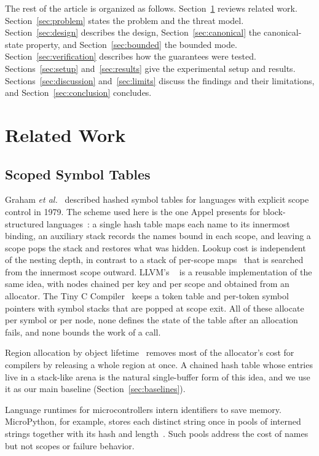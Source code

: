 The rest of the article is organized as follows. Section~\ref{sec:related} reviews related work. Section~\ref{sec:problem} states the problem and the threat model. Section~\ref{sec:design} describes the design, Section~\ref{sec:canonical} the canonical-state property, and Section~\ref{sec:bounded} the bounded mode. Section~\ref{sec:verification} describes how the guarantees were tested. Sections~\ref{sec:setup} and~\ref{sec:results} give the experimental setup and results. Sections~\ref{sec:discussion} and~\ref{sec:limits} discuss the findings and their limitations, and Section~\ref{sec:conclusion} concludes.

\section{Related Work}
\label{sec:related}

\subsection{Scoped Symbol Tables}
Graham \emph{et al.}~\cite{graham1979} described hashed symbol tables for languages with explicit scope control in 1979. The scheme used here is the one Appel presents for block-structured languages~\cite{appel1998}: a single hash table maps each name to its innermost binding, an auxiliary stack records the names bound in each scope, and leaving a scope pops the stack and restores what was hidden. Lookup cost is independent of the nesting depth, in contrast to a stack of per-scope maps~\cite{aho2006} that is searched from the innermost scope outward. LLVM's ~\cite{llvmsht} is a reusable implementation of the same idea, with nodes chained per key and per scope and obtained from an allocator. The Tiny C Compiler~\cite{tcc} keeps a token table and per-token symbol pointers with symbol stacks that are popped at scope exit. All of these allocate per symbol or per node, none defines the state of the table after an allocation fails, and none bounds the work of a call.

Region allocation by object lifetime~\cite{hanson1990} removes most of the allocator's cost for compilers by releasing a whole region at once. A chained hash table whose entries live in a stack-like arena is the natural single-buffer form of this idea, and we use it as our main baseline (Section~\ref{sec:baselines}).

Language runtimes for microcontrollers intern identifiers to save memory. MicroPython, for example, stores each distinct string once in pools of interned strings together with its hash and length~\cite{micropython}. Such pools address the cost of names but not scopes or failure behavior.

